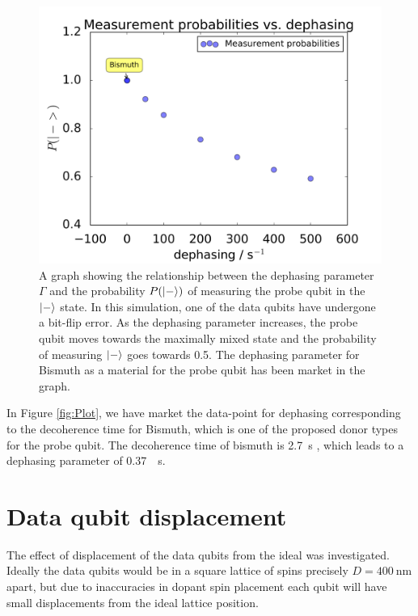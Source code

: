 \begin{figure}[!ht]
	\centering
	\includegraphics[width=\textwidth]{Figures/phase_graph.png}
		\caption{A graph showing the relationship between the dephasing parameter $\Gamma$ and the probability $P(\ket{-})$ of measuring the probe qubit in the $\ket{-}$ state. In this simulation, one of the data qubits have undergone a bit-flip error. As the dephasing parameter increases, the probe qubit moves towards the maximally mixed state and the probability of measuring $\ket{-}$ goes towards 0.5. The dephasing parameter for Bismuth as a material for the probe qubit has been market in the graph.}
\end{figure}



In Figure \ref{fig:Plot}, we have market the data-point for dephasing corresponding to the decoherence time for Bismuth, which is one of the proposed donor types for the probe qubit. The decoherence time of bismuth is \SI{2.7}{\second} \cite{something}, which leads to a dephasing parameter of \SI{0.37}{\per\second}. 



\clearpage
\section{Data qubit displacement}
The effect of displacement of the data qubits from the ideal was investigated. Ideally the data qubits would be in a square lattice of spins precisely $D = \SI{400}{\nano\metre}$ apart, but due to inaccuracies in dopant spin placement each qubit will have small displacements from the ideal lattice position.


